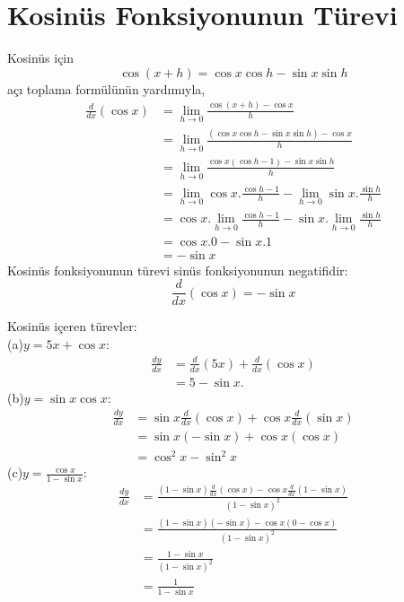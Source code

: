\section{\protect Kosinüs Fonksiyonunun Türevi} \label{bolumetiketi}
Kosinüs için
	\begin{equation*}
	\cos(x+h) = \cos x \cos h-\sin x \sin h
	\end{equation*}
açı toplama formülünün yardımıyla,
	\begin{equation*}
	\begin{split}
		\frac{d}{dx}(\cos x)&=	\lim _{h\rightarrow 0}\frac{\cos(x+h)-\cos x}{h}\\
	&=\lim _{h\rightarrow 0}\frac{(\cos x \cos h-\sin x \sin h)-\cos x}{h}\\
	&=\lim _{h\rightarrow 0}\frac{\cos x(\cos h -1)-\sin x\sin h}{h}\\
	&=\lim _{h\rightarrow 0}\cos x.\frac{\cos h -1}{h}-\lim _{h\rightarrow 0}\sin x.\frac{\sin h}{h}\\
	&=\cos x.\lim _{h\rightarrow 0}\frac{\cos h -1}{h}-\sin x.\lim _{h\rightarrow 0}\frac{\sin h}{h}\\
	&=\cos x.0-\sin x.1\\
	&=-\sin x		
	\end{split}
	\end{equation*}
Kosinüs fonksiyonunun türevi sinüs fonksiyonunun negatifidir:
	\begin{equation*}
	\frac{d}{dx}(\cos x)= -\sin x
	\end{equation*}
\begin{ornek}Kosinüs içeren türevler:\\

	(a)$y = 5x+\cos x:$
	\begin{equation*}
	\begin{split}
		\frac{dy}{dx}&=\frac{d}{dx}(5x)+\frac{d}{dx}(\cos x)\\
		&= 5-\sin x.
	\end{split}
	\end{equation*}
	(b)$y=\sin x \cos x:$
	\begin{equation*}
	\begin{split}
	\frac{dy}{dx}&=\sin x \frac{d}{dx}(\cos x)+ \cos x \frac{d}{dx}(\sin x)\\
	&= \sin x(-\sin x)+\cos x(\cos x)\\
	&=\cos^2 x- \sin^2 x
	\end{split}
	\end{equation*}
	(c)$\displaystyle y= \frac{\cos x}{1-\sin x}:$
	\begin{equation*}
	\begin{split}
	\frac{dy}{dx}&= \frac{(1-\sin x)\frac{d}{dx}(\cos x)-\cos x \frac{d}{dx}(1-\sin x)}{(1-\sin x)^2}\\
	&=\frac{(1-\sin x)(-\sin x)-\cos x(0-\cos x)}{(1-\sin x)^2}\\
	&=\frac{1-\sin x}{(1-\sin x)^2}\\
	&= \frac{1}{1-\sin x}
	\end{split}
	\end{equation*}
\end{ornek}
